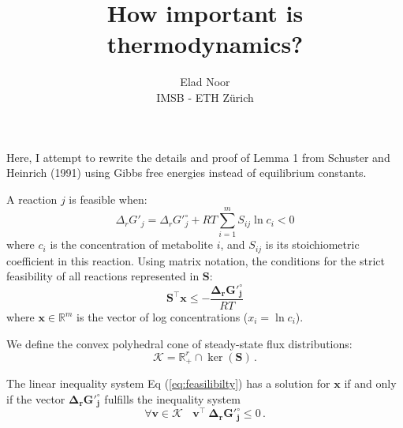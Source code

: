 \documentclass[12pt]{article}
\newenvironment{lemma}[2][Lemma]{\begin{trivlist}
\item[\hskip \labelsep {\bfseries #1}\hskip \labelsep {\bfseries #2.}]}{\end{trivlist}}
\begin{document}
 
 
 
\title{How important is thermodynamics?}%
\author{Elad Noor\\ %
IMSB - ETH Z\"{u}rich} %
 
\maketitle

Here, I attempt to rewrite the details and proof of Lemma 1 from Schuster and Heinrich (1991) using Gibbs free energies instead of equilibrium constants.

A reaction $j$ is feasible when:
\begin{equation}
    \Delta_r G'_j = \Delta_r G'^\circ_j + RT \sum_{i=1}^{m} S_{ij} \ln{c_i} < 0
\end{equation}
where $c_i$ is the concentration of metabolite $i$, and $S_{ij}$ is its stoichiometric coefficient in this reaction. Using matrix notation, the conditions for the strict feasibility of all reactions represented in $\mathbf{S}$:
\begin{equation}\label{eq:feasilibilty}
    \mathbf{S}^\top \mathbf{x} \leq -\frac{\mathbf{\Delta_r G'^\circ_j}}{RT}
\end{equation}
where $\mathbf{x} \in \mathbb{R}^m$ is the vector of log concentrations ($x_i = \ln{c_i}$).

We define the convex polyhedral cone of steady-state flux distributions:
\begin{equation}
    \mathcal{K} = \mathbb{R}_+^r \cap \ker(\mathbf{S})\,.
\end{equation}

\begin{lemma}{1}
The linear inequality system Eq (\ref{eq:feasilibilty}) has a solution for $\mathbf{x}$ if and only if the vector $\mathbf{\Delta_r G'^\circ_j}$ fulfills the inequality system
\begin{equation}\label{eq:negative_product}
    \forall \mathbf{v} \in \mathcal{K}~~~~\mathbf{v}^\top~\mathbf{\Delta_r G'^\circ_j} \leq 0\,.
\end{equation}
\end{lemma}
 
\end{document}
